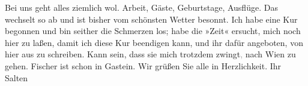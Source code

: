 \pstart
           Bei uns geht alles ziemlich
               wol. Arbeit, Gäste, Geburtstage, Ausflüge. Das wechselt so ab und ist bisher vom
               schönsten Wetter besonnt. Ich habe eine Kur begonnen und bin seither die Schmerzen
               los; habe die »Zeit« ersucht, mich noch hier zu laßen, damit ich diese
               Kur beendigen kann, und ihr dafür angeboten, von hier aus zu schreiben. Kann sein,
               dass sie mich trotzdem zwingt\textcolor{gray}{,} nach Wien zu gehen. Fischer ist schon in
                  Gastein. Wir grüßen Sie alle in
               Herzlichkeit.\pend
           \pstart Ihr \spacefill\mbox{Salten}\pend{}\endnumbering{}  
      
